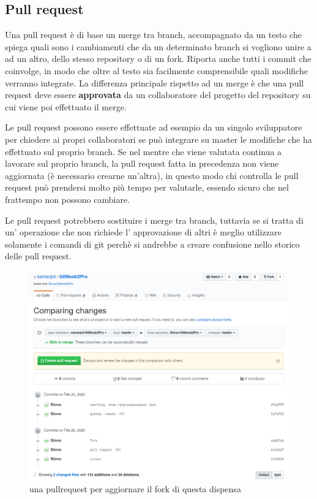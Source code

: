 \documentclass{article} \usepackage[textwidth=19cm,textheight=24cm]{geometry}
\begin{document}
\subsection{Pull request\label{pullrequest}}
Una pull request è di base un merge tra branch, accompagnato da un testo che
spiega quali sono i cambiamenti che da un determinato branch si vogliono unire a
ad un altro, dello stesso repository o di un fork.
Riporta anche tutti i commit che coinvolge, in modo che oltre al testo sia
facilmente comprensibile quali modifiche verranno integrate.
La differenza principale rispetto ad un merge è che una pull request deve essere
\textbf{approvata} da un collaboratore del progetto del repository su cui viene
poi effettuato il merge.

Le pull request possono essere effettuate ad esempio da un singolo sviluppatore
per chiedere ai propri collaboratori se può integrare su master le modifiche che ha
effettuato sul proprio branch. Se nel mentre che viene valutata continua a
lavorare sul proprio branch, la pull request fatta in precedenza non viene
aggiornata (è necessario crearne un'altra), in questo modo chi controlla le pull
request può prendersi molto più tempo per valutarle, essendo sicuro che nel
frattempo non possono cambiare.

Le pull request potrebbero sostituire i merge tra branch, tuttavia se si
tratta di un' operazione che non richiede l' approvazione di altri è meglio
utilizzare solamente i comandi di git perchè si andrebbe a creare confusione 
nello storico delle pull request.

\begin{figure}
\includegraphics[width=6in]{img/pullRequest.png}
\centering
\caption{una pullrequest per aggiornare il fork di questa dispensa}
\end{figure}
\end{document}
